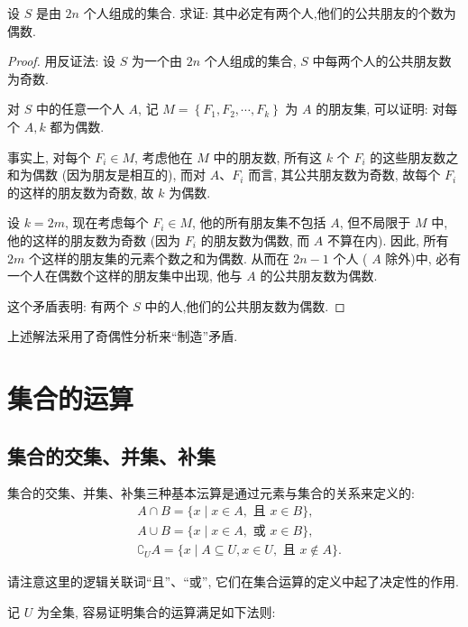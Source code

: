 \begin{example}
	设 $S$ 是由 $2 n$ 个人组成的集合. 求证: 其中必定有两个人,他们的公共朋友的个数为偶数.
\end{example}
\begin{proof}
	用反证法: 设 $S$ 为一个由 $2 n$ 个人组成的集合, $S$ 中每两个人的公共朋友数为奇数.

	对 $S$ 中的任意一个人 $A$, 记 $M=\left\{F_{1}, F_{2}, \cdots, F_{k}\right\}$ 为 $A$ 的朋友集, 可以证明: 对每个 $A, k$ 都为偶数.

	事实上, 对每个 $F_{i} \in M$, 考虑他在 $M$ 中的朋友数, 所有这 $k$ 个 $F_{i}$ 的这些朋友数之和为偶数 (因为朋友是相互的), 而对 $A 、 F_{i}$ 而言, 其公共朋友数为奇数, 故每个 $F_{i}$ 的这样的朋友数为奇数, 故 $k$ 为偶数.

	设 $k=2 m$, 现在考虑每个 $F_{i} \in M$, 他的所有朋友集不包括 $A$, 但不局限于 $M$ 中, 他的这样的朋友数为奇数 (因为 $F_{i}$ 的朋友数为偶数, 而 $A$ 不算在内). 因此, 所有 $2 m$ 个这样的朋友集的元素个数之和为偶数. 从而在 $2 n-1$ 个人 ( $A$ 除外)中, 必有一个人在偶数个这样的朋友集中出现, 他与 $A$ 的公共朋友数为偶数.

	这个矛盾表明: 有两个 $S$ 中的人,他们的公共朋友数为偶数.
\end{proof}

\begin{note}
	上述解法采用了奇偶性分析来“制造”矛盾.
\end{note}

\section{集合的运算}

\subsection{集合的交集、并集、补集}
集合的交集、并集、补集三种基本沄算是通过元素与集合的关系来定义的:
$$
	\begin{aligned}
		 & A \cap B=\{x \mid x \in A, \text { 且 } x \in B\},                             \\
		 & A \cup B=\{x \mid x \in A, \text { 或 } x \in B\},                             \\
		 & \complement_{U} A=\{x \mid A \subseteq U, x \in U, \text { 且 } x \notin A\} .
	\end{aligned}
$$

请注意这里的逻辑关联词“且”、“或”, 它们在集合运算的定义中起了决定性的作用.

记 $U$ 为全集, 容易证明集合的运算满足如下法则:

